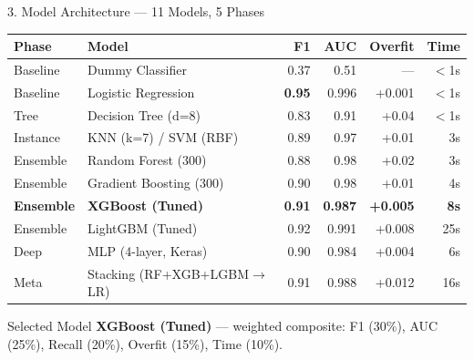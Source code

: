 \documentclass[aspectratio=169, 10pt]{beamer}
\begin{document}
\begin{frame}{3. Model Architecture --- 11 Models, 5 Phases}
\footnotesize
\begin{center}
\begin{tabular}{@{}l l r r r r@{}}
  \toprule
  \textbf{Phase} & \textbf{Model} & \textbf{F1} & \textbf{AUC} & \textbf{Overfit} & \textbf{Time} \\
  \midrule
  Baseline  & Dummy Classifier            & 0.37 & 0.51  & ---     & $<$1s \\
  Baseline  & Logistic Regression         & \textbf{0.95} & 0.996 & +0.001 & $<$1s \\
  Tree      & Decision Tree (d=8)         & 0.83 & 0.91  & +0.04  & $<$1s \\
  Instance  & KNN (k=7) / SVM (RBF)       & 0.89 & 0.97  & +0.01  & 3s \\
  Ensemble  & Random Forest (300)         & 0.88 & 0.98  & +0.02  & 3s \\
  Ensemble  & Gradient Boosting (300)     & 0.90 & 0.98  & +0.01  & 4s \\
  \rowcolor{teal!15}
  \textbf{Ensemble} & \textbf{XGBoost (Tuned)} & \textbf{0.91} & \textbf{0.987} & \textbf{+0.005} & \textbf{8s} \\
  Ensemble  & LightGBM (Tuned)            & 0.92 & 0.991 & +0.008 & 25s \\
  Deep      & MLP (4-layer, Keras)        & 0.90 & 0.984 & +0.004 & 6s \\
  Meta      & Stacking (RF+XGB+LGBM$\to$LR) & 0.91 & 0.988 & +0.012 & 16s \\
  \bottomrule
\end{tabular}
\end{center}

\vspace{2pt}
\begin{alertblock}{Selected Model}
\small\textbf{XGBoost (Tuned)} --- weighted composite: F1 (30\%), AUC (25\%), Recall (20\%), Overfit (15\%), Time (10\%).
\end{alertblock}
\end{frame}
\end{document}
